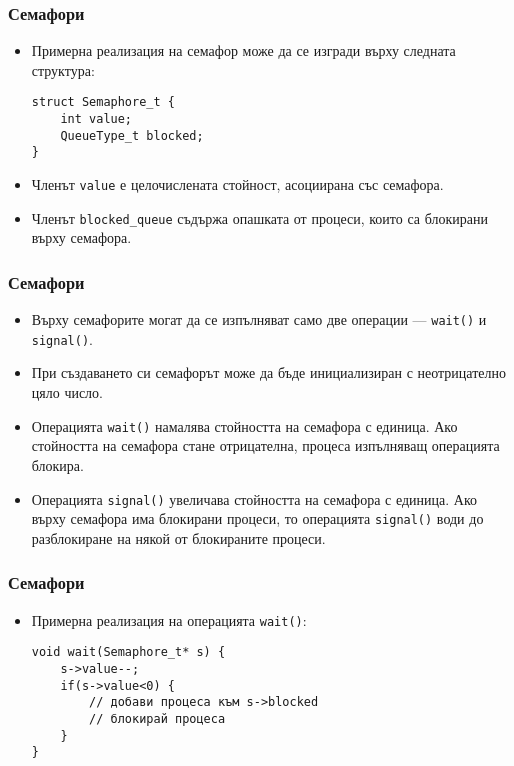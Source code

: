 \documentclass[ignorenonframetext, hyperref=unicode]{beamer}
\begin{document}
\begin{frame}[containsverbatim]
\frametitle{Семафори}
\begin{itemize}
\item Примерна реализация на семафор може да се изгради върху следната
структура:
\begin{lstlisting}
struct Semaphore_t {
	int value;
	QueueType_t blocked;
} 
\end{lstlisting}
\item Членът \lstinline{value} е целочислената стойност, асоциирана със
семафора.
\item Членът \lstinline{blocked_queue} съдържа опашката от процеси, които са
блокирани върху семафора.
\end{itemize}
\end{frame}

\begin{frame}[containsverbatim]
\frametitle{Семафори}
\begin{itemize}
\item Върху семафорите могат да се изпълняват само две операции —
\lstinline{wait()} и \lstinline{signal()}.
\item При създаването си семафорът може да бъде инициализиран с неотрицателно
цяло число.
\item Операцията \lstinline{wait()} намалява стойността на семафора с единица.
Ако стойността на семафора стане отрицателна, процеса изпълняващ операцията
блокира.
\item Операцията \lstinline{signal()} увеличава стойността на семафора с
единица. Ако върху семафора има блокирани процеси, то операцията
\lstinline{signal()} води до разблокиране на някой от блокираните процеси.
\end{itemize}
\end{frame}


\begin{frame}[containsverbatim]
\frametitle{Семафори}
\begin{itemize}
\item Примерна реализация на операцията \lstinline{wait()}:
\begin{lstlisting}
void wait(Semaphore_t* s) {
	s->value--;
	if(s->value<0) {
		// добави процеса към s->blocked
		// блокирай процеса
	}
}
\end{lstlisting}
\end{itemize}
\end{frame}
\end{document}
